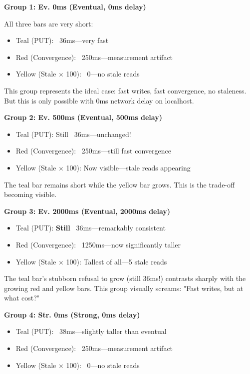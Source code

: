 \documentclass[10pt,a4paper]{article}
\begin{document}
\textbf{Group 1: Ev. 0ms (Eventual, 0ms delay)}

All three bars are very short:
\begin{itemize}
    \item Teal (PUT): ~36ms---very fast
    \item Red (Convergence): ~250ms---measurement artifact
    \item Yellow (Stale × 100): ~0---no stale reads
\end{itemize}

This group represents the ideal case: fast writes, fast convergence, no staleness. But this is only possible with 0ms network delay on localhost.

\textbf{Group 2: Ev. 500ms (Eventual, 500ms delay)}

\begin{itemize}
    \item Teal (PUT): Still ~36ms---unchanged!
    \item Red (Convergence): ~250ms---still fast convergence
    \item Yellow (Stale × 100): Now visible---stale reads appearing
\end{itemize}

The teal bar remains short while the yellow bar grows. This is the trade-off becoming visible.

\textbf{Group 3: Ev. 2000ms (Eventual, 2000ms delay)}

\begin{itemize}
    \item Teal (PUT): \textbf{Still} ~36ms---remarkably consistent
    \item Red (Convergence): ~1250ms---now significantly taller
    \item Yellow (Stale × 100): Tallest of all---5 stale reads
\end{itemize}

The teal bar's stubborn refusal to grow (still 36ms!) contrasts sharply with the growing red and yellow bars. This group visually screams: "Fast writes, but at what cost?"

\textbf{Group 4: Str. 0ms (Strong, 0ms delay)}

\begin{itemize}
    \item Teal (PUT): ~38ms---slightly taller than eventual
    \item Red (Convergence): ~250ms---measurement artifact
    \item Yellow (Stale × 100): ~0---no stale reads
\end{itemize}
\end{document}
